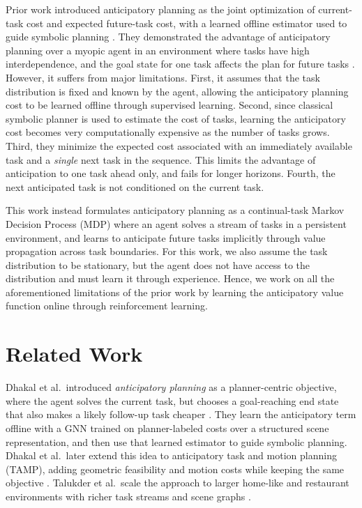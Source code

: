 \documentclass{article}
\begin{document}
Prior work introduced anticipatory planning as the joint optimization of current-task cost and expected future-task cost, with a learned offline estimator used to guide symbolic planning \cite{dhakal2023anticipatory}. They demonstrated the advantage of anticipatory planning over a myopic agent in an environment where tasks have high interdependence, and the goal state for one task affects the plan for future tasks \cite{dhakal2023anticipatory,dhakal2024tamp,talukder2024large,arora2024anticipate,singh2024anticipate}. 
However, it suffers from major limitations. First, it assumes that the task distribution is fixed and known by the agent, allowing the anticipatory planning cost to be learned offline through supervised learning. Second, since classical symbolic planner is used to estimate the cost of tasks, learning the anticipatory cost becomes very computationally expensive as the number of tasks grows. Third, they minimize the expected cost associated with an immediately available task and a \textit{single} next task in the sequence. This limits the advantage of anticipation to one task ahead only, and fails for longer horizons. Fourth, the next anticipated task is not conditioned on the current task.

This work instead formulates anticipatory planning as a continual-task Markov Decision Process (MDP) where an agent solves a stream of tasks in a persistent environment, and learns to anticipate future tasks implicitly through value propagation across task boundaries. 
For this work, we also assume the task distribution to be stationary, but the agent does not have access to the distribution and must learn it through experience. Hence, we work on all the aforementioned limitations of the prior work by learning the anticipatory value function online through reinforcement learning.


\section{Related Work}
Dhakal et al.\ introduced \emph{anticipatory planning} as a planner-centric objective, where the agent solves the current task, but chooses a goal-reaching end state that also makes a likely follow-up task cheaper \cite{dhakal2023anticipatory}. They learn the anticipatory term offline with a GNN trained on planner-labeled costs over a structured scene representation, and then use that learned estimator to guide symbolic planning. Dhakal et al.\ later extend this idea to anticipatory task and motion planning (TAMP), adding geometric feasibility and motion costs while keeping the same objective \cite{dhakal2024tamp}. Talukder et al.\ scale the approach to larger home-like and restaurant environments with richer task streams and scene graphs \cite{talukder2024large}.
\end{document}

